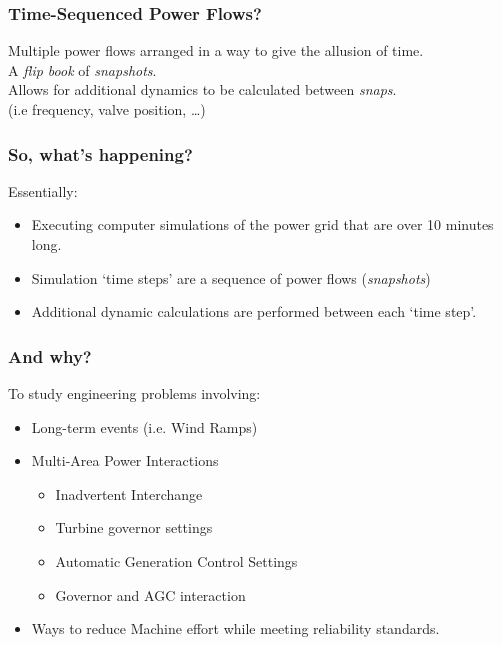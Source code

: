\documentclass[14pt, unknownkeysallowed]{beamer}
\begin{document}
\begin{frame}
\frametitle{Time-Sequenced Power Flows?}
Multiple power flows arranged in a way to give the allusion of time.\\
\vspace{1em}
A \emph{flip book} of \emph{snapshots}.\\
\vspace{1em}
Allows for additional dynamics to be calculated between \emph{snaps}.\\(i.e frequency, valve position, \ldots )\\
\end{frame}
\begin{frame}
\frametitle{So, what's happening?}
Essentially:
\begin{itemize}
	\item Executing computer simulations of the power grid that are  over 10 minutes long.
	\item Simulation `time steps' are a sequence of power flows (\emph{snapshots})
	\item Additional dynamic calculations are performed between each `time step'.
\end{itemize}

\end{frame}
\begin{frame}
\frametitle{And why?}
To study engineering problems involving:
\begin{itemize}
	\item Long-term events (i.e. Wind Ramps)
	\item Multi-Area Power Interactions
	\begin{itemize}
		\item Inadvertent Interchange
		\item Turbine governor settings
		\item Automatic Generation Control Settings
		\item Governor and AGC interaction
	\end{itemize}
	\item Ways to reduce Machine effort while meeting reliability standards.
\end{itemize}
\end{frame}
\end{document}
